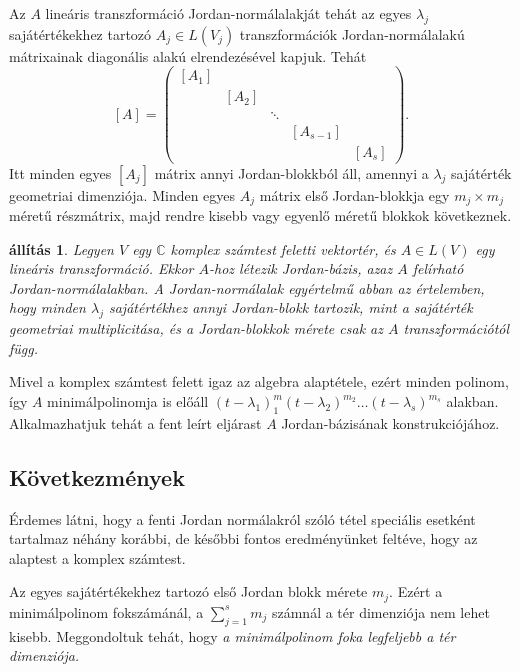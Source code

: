 \documentclass[a4paper, showtrims]{memoir}
\makeatletter
\renewenvironment{proof}[1][\proofname]
    {\par\pushQED{\qed}%
    \normalfont \topsep6\p@\@plus6\p@\relax
    \trivlist
    \item[\hskip\labelsep
        \itshape
    #1\@addpunct{:}]\ignorespaces}
    {\popQED\endtrivlist\@endpefalse}
\theoremstyle{plain}
\newtheorem{proposition}{állítás}[chapter]
\theoremstyle{remark}
\theoremstyle{definition}
\makeatother
\begin{document}
Az $A$ lineáris transzformáció Jordan-normálalakját tehát az egyes $\lambda_j$ sajátértékekhez tartozó $A_j\in L\left( V_j \right)$
transzformációk Jordan-normálalakú mátrixainak diagonális alakú elrendezésével kapjuk.
Tehát
\[
	[A]
	=
	\begin{pmatrix}
		[A_1] &             &        &                 &             \\
		      & \!\!\![A_2] &        &                 &             \\
		      & \!\!\!      & \ddots &                 &             \\
		      & \!\!\!      &        & \!\!\![A_{s-1}] &             \\
		      & \!\!\!      &        & \!\!\!          & \!\!\![A_s]
	\end{pmatrix}.
\]
Itt minden egyes $[A_j]$ mátrix annyi Jordan-blokkból áll,
amennyi a $\lambda_j$ sajátérték geometriai dimenziója.
Minden egyes $A_j$ mátrix első Jordan-blokkja
egy $m_j\times m_j$ méretű részmátrix,
majd rendre kisebb vagy egyenlő méretű blokkok következnek.
\begin{proposition}
	Legyen $V$ egy $\mathbb{C}$ komplex számtest feletti vektortér,
	és $A\in L\left( V \right)$ egy lineáris transzformáció.
	Ekkor $A$-hoz létezik Jordan-bázis, azaz $A$ felírható Jordan-normálalakban.
	A Jordan-normálalak egyértelmű abban az értelemben,
	hogy minden $\lambda_j$ sajátértékhez annyi Jordan-blokk tartozik, mint
	a sajátérték geometriai multiplicitása, és a Jordan-blokkok mérete csak az $A$ transzformációtól függ.
\end{proposition}
\begin{proof}
	Mivel a komplex számtest felett igaz az algebra alaptétele,
	ezért minden polinom, így $A$ minimálpolinomja is előáll
	$\left( t-\lambda_1 \right)^m_1\left( t-\lambda_2 \right)^{m_2}\dots\left( t-\lambda_s \right)^{m_s}$
	alakban.
	Alkalmazhatjuk tehát a fent leírt eljárast $A$ Jordan-bázisának konstrukciójához.
\end{proof}

\subsection{Következmények}
Érdemes látni,
hogy a fenti Jordan normálakról szóló tétel speciális esetként tartalmaz néhány korábbi,
de későbbi fontos eredményünket feltéve, hogy az alaptest a komplex számtest.

Az egyes sajátértékekhez tartozó első Jordan blokk mérete $m_j$.
Ezért a minimálpolinom fokszámánál, a $\sum_{j=1}^sm_j$ számnál a tér dimenziója nem lehet kisebb.
Meggondoltuk tehát, hogy \emph{a minimálpolinom foka legfeljebb  a tér dimenziója.}
\end{document}
